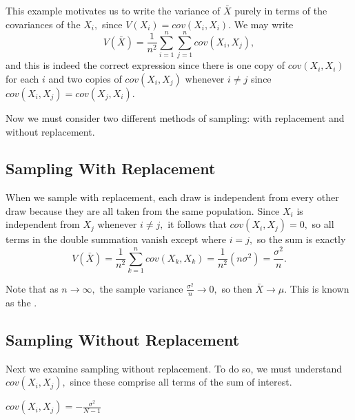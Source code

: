 \documentclass{article}
\begin{document}
This example motivates us to write the variance of $\bar{X}$ purely in terms of the covariances of the $X_i,$ since $V(X_i)=cov(X_i, X_i).$ We may write \[ V(\bar{X})=\frac{1}{n^2}\sum_{i=1}^n\sum_{j=1}^n cov(X_i, X_j), \] and this is indeed the correct expression since there is one copy of $cov(X_i, X_i)$ for each $i$ and two copies of $cov(X_i, X_j)$ whenever $i\neq j$ since $cov(X_i, X_j)=cov(X_j, X_i).$ 

Now we must consider two different methods of sampling: with replacement and without replacement. 

\subsection{Sampling With Replacement}
When we sample with replacement, each draw is independent from every other draw because they are all taken from the same population. Since $X_i$ is independent from $X_j$ whenever $i\neq j,$ it follows that $cov(X_i, X_j)=0,$ so all terms in the double summation vanish except where $i=j,$ so the sum is exactly \[V(\bar{X})=\frac{1}{n^2}\sum_{k=1}^n cov(X_k, X_k)=\frac{1}{n^2}(n\sigma^2)=\frac{\sigma^2}{n}.\]

\begin{remark}
	Note that as $n\to\infty,$ the sample variance $\frac{\sigma^2}{n}\to 0,$ so then $\bar{X}\to \mu.$ This is known as the .
\end{remark}

\subsection{Sampling Without Replacement}
Next we examine sampling without replacement. To do so, we must understand $cov(X_i, X_j),$ since these comprise all terms of the sum of interest.

\begin{claim}
	$cov(X_i, X_j)=-\frac{\sigma^2}{N-1}$
\end{claim}
\end{document}
